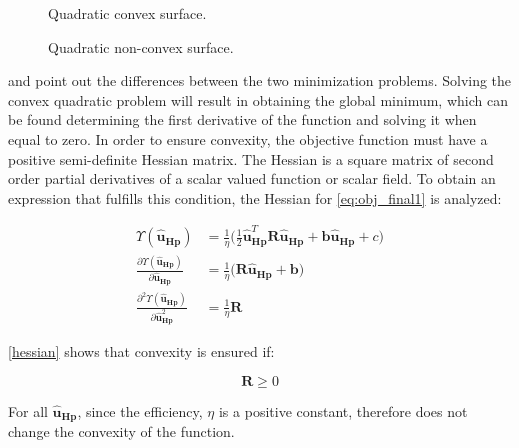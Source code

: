 \begin{figure}[H]
  \centering
  \begin{minipage}[h]{0.45\textwidth}
  \centering
     
    \caption{Quadratic convex surface.}
    \label{convexfig}
  \end{minipage}
  \hfill
  \begin{minipage}[h]{0.45\textwidth}
  \centering
     
    \caption{Quadratic non-convex surface.}
    \label{nonconvexfig}
  \end{minipage}
  \label{fig:nonlinearpumps}
\end{figure}

  and  point out the differences between the two minimization problems. Solving the convex quadratic problem will result in obtaining the global minimum, which can be found determining the first derivative of the function and solving it when equal to zero. 
 In order to ensure convexity, the objective function must have a positive semi-definite Hessian matrix. The Hessian is a square matrix of second order partial derivatives of a scalar valued function or scalar field. To obtain an expression that fulfills this condition, the Hessian for \eqref{eq:obj_final1} is analyzed: 

\begin{align}
%
\Upsilon(\bm{\hat{u}}_{\bm{Hp}}) &= \frac{1}{\eta}\bigg( \frac{1}{2} \bm{\hat{u}}_{\bm{Hp}}^{T} \bm{R} \bm{\hat{u}}_{\bm{Hp}} + \bm{b} \bm{\hat{u}}_{\bm{Hp}} + c \bigg)\\
%
\frac{\partial \Upsilon(\bm{\hat{u}}_{\bm{Hp}})}{\partial \bm{\hat{u}}_{\bm{Hp}}} &= \frac{1}{\eta} \big(\bm{R} \bm{\hat{u}}_{\bm{Hp}} + \bm{b} \big)\\
%
\frac{\partial^2 \Upsilon(\bm{\hat{u}}_{\bm{Hp}})}{\partial {\bm{\hat{u}}}^{2}_{\bm{Hp}}} &= \frac{1}{\eta} \bm{R} 
\label{hessian}
%
\end{align}

\eqref{hessian} shows that convexity is ensured if:

\begin{equation}
\bm{R} \geq 0  
\end{equation}

For all $\bm{\hat{u}}_{\bm{Hp}} $, since the efficiency, $\eta$ is a positive constant, therefore does not change the convexity of the function. 

